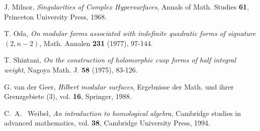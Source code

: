 \begin{thebibliography}{99}
J. Milnor,
\emph{Singularities of Complex Hypersurfaces},
Annals of Math. Studies {\bf 61}, Princeton University Press, 1968.



T. Oda,
\emph{On modular forms associated with indefinite quadratic forms of signature $(2,n-2)$},
Math. Annalen \textbf{231} (1977), 97-144.


T. Shintani, \emph{On the construction of
holomorphic cusp forms of half integral weight}, Nagoya Math. J.
\textbf{58} (1975), 83-126.





G. van der Geer, \emph{Hilbert modular surfaces}, Ergebnisse der
Math. und ihrer Grenzgebiete (3), vol. \textbf{16}, Springer, 1988.


C.\ A. \  Weibel, \emph{An introduction to homological algebra}, Cambridge studies in advanced mathematics, vol. 
\textbf{38}, Cambridge University Press, 1994.





\end{thebibliography}







